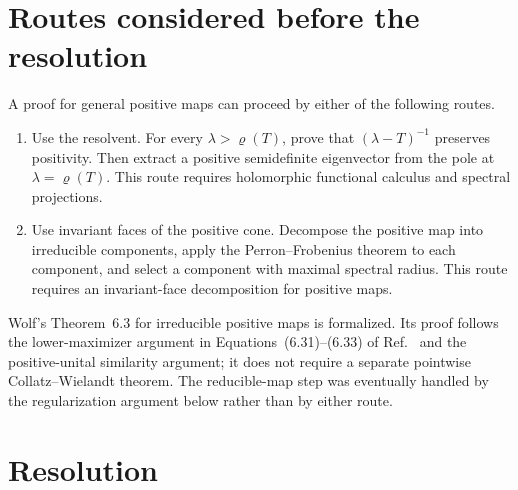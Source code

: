 \documentclass{article}
\begin{document}
\section{Routes considered before the resolution}

A proof for general positive maps can proceed by either of the following
routes.
\begin{enumerate}
    \item Use the resolvent. For every
        $\lambda>\varrho(T)$, prove that $(\lambda-T)^{-1}$ preserves
        positivity. Then extract a positive semidefinite eigenvector from the
        pole at $\lambda=\varrho(T)$. This route requires holomorphic
        functional calculus and spectral projections.

    \item Use invariant faces of the positive cone. Decompose the positive
        map into irreducible components, apply the Perron--Frobenius theorem
        to each component, and select a component with maximal spectral
        radius. This route requires an invariant-face decomposition for
        positive maps.
\end{enumerate}

Wolf's Theorem~6.3 for irreducible positive maps
\cite{Wolf2012Quantum} is formalized. Its proof follows the lower-maximizer
argument in Equations~(6.31)--(6.33) of Ref.~\cite{Wolf2012Quantum} and the
positive-unital similarity argument; it does not require a separate
pointwise Collatz--Wielandt theorem. The reducible-map step was eventually
handled by the regularization argument below rather than by either route.

\section{Resolution}
\end{document}
